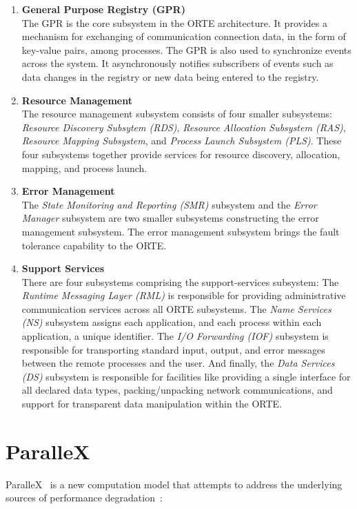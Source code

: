 \begin{enumerate}
\item \textbf{General Purpose Registry (GPR)}\\
  The GPR is the core subsystem in the ORTE architecture. It provides a mechanism for exchanging of communication connection data, in the form of key-value pairs, among processes.  The GPR is also used to synchronize events across the system. It asynchronously notifies subscribers of events such as data changes in the registry or new data being entered to the registry.
\item \textbf{Resource Management}\\
  The resource management subsystem consists of four smaller subsystems: \textit{Resource Discovery Subsytem (RDS)}, \textit{Resource Allocation Subsystem (RAS)}, \textit{Resource Mapping Subsystem}, and \textit{Process Launch Subsystem (PLS)}. These four subsystems together provide services for resource discovery, allocation, mapping, and process launch. 
\item \textbf{Error Management}\\
  The \textit{State Monitoring and Reporting (SMR)} subsystem and the \textit{Error Manager} subsystem are two smaller subsystems constructing the error management subsystem. The error management subsystem brings the fault tolerance capability to the ORTE.
\item \textbf{Support Services}\\
  There are four subsystems comprising the support-services subsystem: The \textit{Runtime Messaging Layer (RML)} is responsible for providing administrative communication services across all ORTE subsystems. The \textit{Name Services (NS)} subsystem assigns each application, and each process within each application, a unique identifier. The \textit{I/O Forwarding (IOF)} subsystem is responsible for transporting standard input, output, and error messages between the remote processes and the user. And finally, the \textit{Data Services (DS)} subsystem is responsible for facilities like providing a single interface for all declared data types, packing/unpacking network communications, and support for transparent data manipulation within the ORTE.
\end{enumerate}


\section{ParalleX}
\label{sec:parallex}
ParalleX~\cite{kaiser2009parallex} is a new computation model that attempts to address the underlying sources of performance degradation~\cite{sterling2010enabling}:


